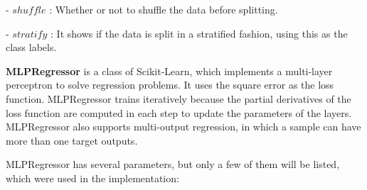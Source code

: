 \noindent- $shuffle$ : Whether or not to shuffle the data before splitting.\smallskip

\noindent - $stratify$ : It shows if the data is split in a stratified fashion, using this as the class labels.\bigskip

\newpage

\textbf{MLPRegressor} is a class of Scikit-Learn, which implements a multi-layer perceptron to solve regression problems. It uses the square error as the loss function. MLPRegressor trains iteratively because the partial derivatives of the loss function are computed in each step to update the parameters of the layers. MLPRegressor also supports multi-output regression, in which a sample can have more than one target outputs.\medskip

\noindent MLPRegressor has several parameters, but only a few of them will be listed, which were used in the implementation:
